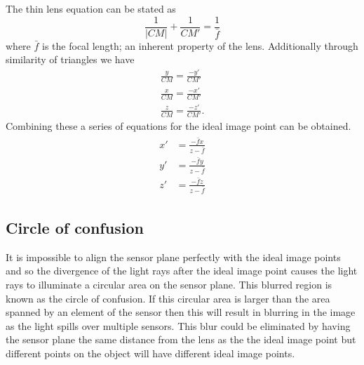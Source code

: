 \documentclass[12pt,oneside,openany,a4paper, %
english, %
masters-t, goldenblock]{usthesis}
\newcommand*\mean[1]{\bar{#1}} %
\begin{document}

The thin lens equation can be stated as
\begin{equation}
\frac{1}{|CM|} + \frac{1}{CM'} = \frac{1}{\mean{f}}
\end{equation}
where $\mean{f}$ is the focal length; an inherent property of the lens. Additionally through similarity of triangles we have
\begin{align}
\frac{y}{CM} = \frac{-y'}{CM'}\\
\frac{x}{CM} = \frac{-x'}{CM'}\\
\frac{z}{CM} = \frac{-z'}{CM'}.
\end{align}
Combining these a series of equations for the ideal image point can be obtained.
\begin{align}
\label{eq:optics y'2y}
\begin{split}
x'&=\frac{-\mean{f} x}{z - \mean{f}} \\
y'&=\frac{-\mean{f} y}{z - \mean{f}} \\
z'&=\frac{-\mean{f} z}{z - \mean{f}}
\end{split}
\end{align}

\subsection{Circle of confusion}
It is impossible to align the sensor plane perfectly with the ideal image points and so the divergence of the light rays after the ideal image point causes the light rays to illuminate a circular area on the sensor plane. This blurred region is known as the circle of confusion. If this circular area is larger than the area spanned by an element of the sensor then this will result in blurring in the image as the light spills over multiple sensors. This blur could be eliminated by having the sensor plane the same distance from the lens as the the ideal image point but different points on the object will have different ideal image points.
\end{document}
